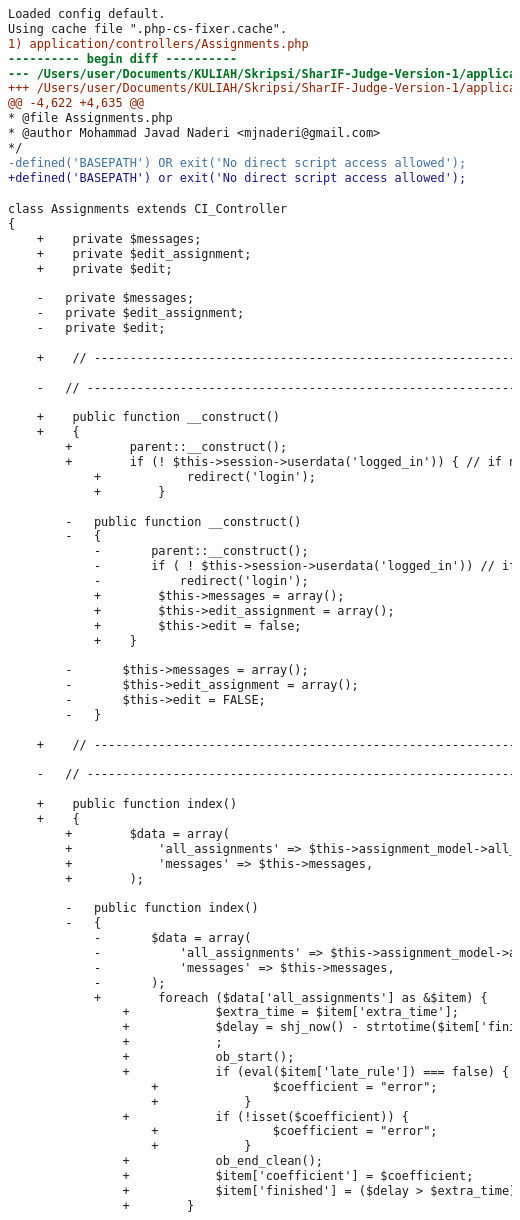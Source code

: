 \begin{lstlisting}[language=diff, caption=Perubahan pada kode Assignments.php]
Loaded config default.
Using cache file ".php-cs-fixer.cache".
1) application/controllers/Assignments.php
---------- begin diff ----------
--- /Users/user/Documents/KULIAH/Skripsi/SharIF-Judge-Version-1/application/controllers/Assignments.php
+++ /Users/user/Documents/KULIAH/Skripsi/SharIF-Judge-Version-1/application/controllers/Assignments.php
@@ -4,622 +4,635 @@
* @file Assignments.php
* @author Mohammad Javad Naderi <mjnaderi@gmail.com>
*/
-defined('BASEPATH') OR exit('No direct script access allowed');
+defined('BASEPATH') or exit('No direct script access allowed');

class Assignments extends CI_Controller
{
	+    private $messages;
	+    private $edit_assignment;
	+    private $edit;
	
	-	private $messages;
	-	private $edit_assignment;
	-	private $edit;
	
	+    // ------------------------------------------------------------------------
	
	-	// ------------------------------------------------------------------------
	
	+    public function __construct()
	+    {
		+        parent::__construct();
		+        if (! $this->session->userdata('logged_in')) { // if not logged in
			+            redirect('login');
			+        }
		
		-	public function __construct()
		-	{
			-		parent::__construct();
			-		if ( ! $this->session->userdata('logged_in')) // if not logged in
			-			redirect('login');
			+        $this->messages = array();
			+        $this->edit_assignment = array();
			+        $this->edit = false;
			+    }
		
		-		$this->messages = array();
		-		$this->edit_assignment = array();
		-		$this->edit = FALSE;
		-	}
	
	+    // ------------------------------------------------------------------------
	
	-	// ------------------------------------------------------------------------
	
	+    public function index()
	+    {
		+        $data = array(
		+            'all_assignments' => $this->assignment_model->all_assignments(),
		+            'messages' => $this->messages,
		+        );
		
		-	public function index()
		-	{
			-		$data = array(
			-			'all_assignments' => $this->assignment_model->all_assignments(),
			-			'messages' => $this->messages,
			-		);
			+        foreach ($data['all_assignments'] as &$item) {
				+            $extra_time = $item['extra_time'];
				+            $delay = shj_now() - strtotime($item['finish_time']);
				+            ;
				+            ob_start();
				+            if (eval($item['late_rule']) === false) {
					+                $coefficient = "error";
					+            }
				+            if (!isset($coefficient)) {
					+                $coefficient = "error";
					+            }
				+            ob_end_clean();
				+            $item['coefficient'] = $coefficient;
				+            $item['finished'] = ($delay > $extra_time);
				+        }
			

\end{lstlisting}
